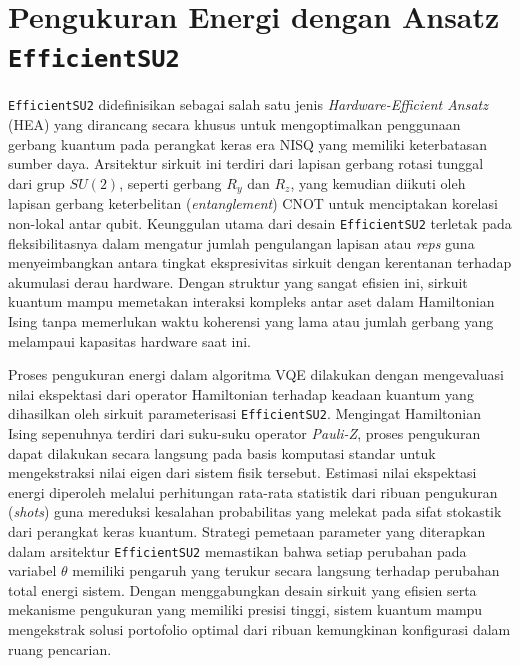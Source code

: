 \section{Pengukuran Energi dengan Ansatz \texttt{EfficientSU2}}
\texttt{EfficientSU2} didefinisikan sebagai salah satu jenis \textit{Hardware-Efficient Ansatz} (HEA) yang dirancang secara khusus untuk mengoptimalkan penggunaan gerbang kuantum pada perangkat keras era NISQ yang memiliki keterbatasan sumber daya. Arsitektur sirkuit ini terdiri dari lapisan gerbang rotasi tunggal dari grup $SU(2)$, seperti gerbang $R_y$ dan $R_z$, yang kemudian diikuti oleh lapisan gerbang keterbelitan (\textit{entanglement}) CNOT untuk menciptakan korelasi non-lokal antar qubit. Keunggulan utama dari desain \texttt{EfficientSU2} terletak pada fleksibilitasnya dalam mengatur jumlah pengulangan lapisan atau \textit{reps} guna menyeimbangkan antara tingkat ekspresivitas sirkuit dengan kerentanan terhadap akumulasi derau hardware. Dengan struktur yang sangat efisien ini, sirkuit kuantum mampu memetakan interaksi kompleks antar aset dalam Hamiltonian Ising tanpa memerlukan waktu koherensi yang lama atau jumlah gerbang yang melampaui kapasitas hardware saat ini.

Proses pengukuran energi dalam algoritma VQE dilakukan dengan mengevaluasi nilai ekspektasi dari operator Hamiltonian terhadap keadaan kuantum yang dihasilkan oleh sirkuit parameterisasi \texttt{EfficientSU2}. Mengingat Hamiltonian Ising sepenuhnya terdiri dari suku-suku operator \textit{Pauli-Z}, proses pengukuran dapat dilakukan secara langsung pada basis komputasi standar untuk mengekstraksi nilai eigen dari sistem fisik tersebut. Estimasi nilai ekspektasi energi diperoleh melalui perhitungan rata-rata statistik dari ribuan pengukuran (\textit{shots}) guna mereduksi kesalahan probabilitas yang melekat pada sifat stokastik dari perangkat keras kuantum. Strategi pemetaan parameter yang diterapkan dalam arsitektur \texttt{EfficientSU2} memastikan bahwa setiap perubahan pada variabel $\theta$ memiliki pengaruh yang terukur secara langsung terhadap perubahan total energi sistem. Dengan menggabungkan desain sirkuit yang efisien serta mekanisme pengukuran yang memiliki presisi tinggi, sistem kuantum mampu mengekstrak solusi portofolio optimal dari ribuan kemungkinan konfigurasi dalam ruang pencarian.
